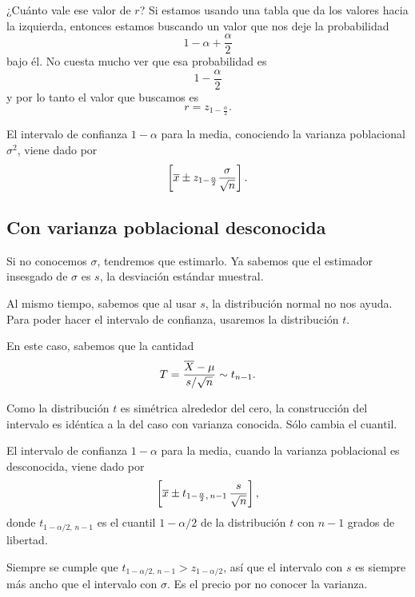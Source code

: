 ¿Cuánto vale ese valor de \(r\)? Si estamos usando una tabla que da los valores hacia la izquierda, entonces estamos buscando un valor que nos deje la probabilidad \[1-\alpha + \frac{\alpha}{2}\] bajo él. No cuesta mucho ver que  esa probabilidad es \[1-\frac{\alpha}{2}\] y por lo tanto el valor que buscamos es \[r=z_{1-\frac{\alpha}{2}}.\]

\begin{definition}
El intervalo de confianza \(1-\alpha\) para la media, conociendo la varianza poblacional \(\sigma^2\), viene dado por \[\left[\overline{x}\pm z_{1-\frac{\alpha}{2}}\frac{\sigma}{\sqrt{n}}\right].\]
\end{definition}

\subsection{Con varianza poblacional desconocida}

Si no conocemos \(\sigma\), tendremos que estimarlo. Ya sabemos que el estimador insesgado de \(\sigma\) es \(s\), la desviación estándar muestral.

Al mismo tiempo, sabemos que al usar \(s\), la distribución normal no nos ayuda. Para poder hacer el intervalo de confianza, usaremos la distribución \(t\).

En este caso, sabemos que la cantidad \[T=\frac{\overline{X} - \mu}{s / \sqrt{n}} \sim t_{n-1}.\]

Como la distribución \(t\) es simétrica alrededor del cero, la construcción del intervalo es idéntica a la del caso con varianza conocida. Sólo cambia el cuantil.

\begin{definition}
El intervalo de confianza \(1-\alpha\) para la media, cuando la varianza poblacional es desconocida, viene dado por \[\left[\overline{x}\pm t_{1-\frac{\alpha}{2},\,n-1}\,\frac{s}{\sqrt{n}}\right],\] donde \(t_{1-\alpha/2,\,n-1}\) es el cuantil \(1-\alpha/2\) de la distribución \(t\) con \(n-1\) grados de libertad.
\end{definition}

Siempre se cumple que \(t_{1-\alpha/2,\,n-1} > z_{1-\alpha/2}\), así que el intervalo con \(s\) es siempre más ancho que el intervalo con \(\sigma\). Es el precio por no conocer la varianza. 

